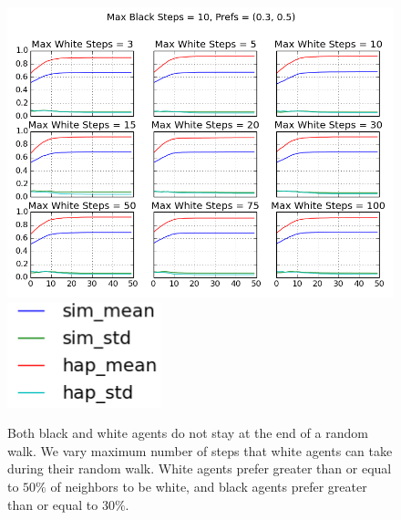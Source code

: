 \documentclass[11pt,twoside]{amsart}
\theoremstyle{theorem}
\theoremstyle{definition}
\theoremstyle{remark}
\begin{document}
    \begin{figure}[p]
        \center
        \includegraphics[scale=0.60]{no_stay_at_end_of_rw_change_white_max.png}
        \includegraphics[scale=0.40]{no_stay_at_end_legend.png}
        \caption{Both black and white agents do not stay at the end of a random walk. We vary maximum number of steps that white agents can take during their random walk. White agents prefer greater than or equal to $50\%$ of neighbors to be white, and black agents prefer greater than or equal to $30\%$. }
        \label{fig:no_stay_white}
    \end{figure}
\end{document}
